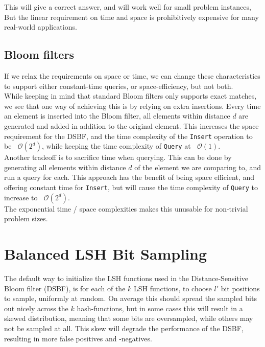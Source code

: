 \documentclass[a4paper,11pt]{article}
\newcommand{\BigO}[1]{\ensuremath{\mathop{}\mathopen{}\mathcal{O}\mathopen{}\left(#1\right)}}
\begin{document}
This will give a correct answer, and will work well for small problem instances, But the linear requirement on time and space is prohibitively expensive for many real-world applications.

\subsection{Bloom filters} If we relax the requirements on space or time, we can change these characteristics to support either constant-time queries, or space-efficiency, but not both.\\

While keeping in mind that standard Bloom filters only supports exact matches, we see that one way of achieving this is by relying on extra insertions. Every time an element is inserted into the Bloom filter, all elements within distance $d$ are generated and added in addition to the original element. This increases the space requirement for the DSBF, and the time complexity of the \texttt{Insert} operation to be \BigO{2^d}, while keeping the time complexity of \texttt{Query} at \BigO{1}.\\

Another tradeoff is to sacrifice time when querying. This can be done by generating all elements within distance $d$ of the element we are comparing to, and run a query for each. This approach has the benefit of being space efficient, and offering constant time for \texttt{Insert}, but will cause the time complexity of \texttt{Query} to increase to \BigO{2^d}.\\

The exponential time / space complexities makes this unusable for non-trivial problem sizes.

\section{Balanced LSH Bit Sampling} \label{sec:balanced}

The default way to initialize the LSH functions used in the Distance-Sensitive Bloom filter (DSBF), is for each of the $k$ LSH functions, to choose $l'$ bit positions to sample, uniformly at random. On average this should spread the sampled bits out nicely across the $k$ hash-functions, but in some cases this will result in a skewed distribution, meaning that some bits are oversampled, while others may not be sampled at all. This skew will degrade the performance of the DSBF, resulting in more false positives and -negatives.
\end{document}
